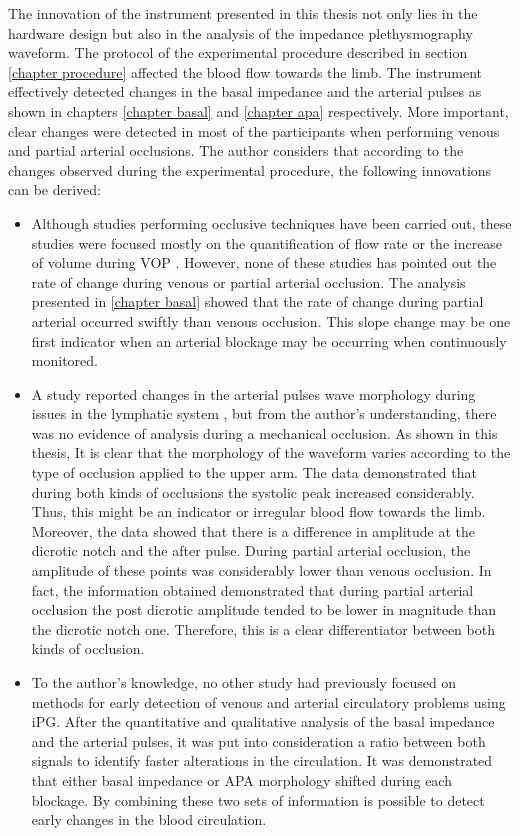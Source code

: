The innovation of the instrument presented in this thesis not only lies in the hardware design but also in the analysis of the impedance plethysmography waveform. The protocol of the experimental procedure described in section \ref{chapter procedure} affected the blood flow towards the limb. The instrument effectively detected changes in the basal impedance and the arterial pulses as shown in chapters \ref{chapter basal} and \ref{chapter apa} respectively. More important, clear changes were detected in most of the participants when performing venous and partial arterial occlusions. The author considers that according to the changes observed during the experimental procedure, the following innovations can be derived:

\begin{itemize}
	\item Although studies performing occlusive techniques have been carried out, these studies were focused mostly on the quantification of flow rate or the increase of volume during VOP \cite{mohapatra1979measurement, costeloe1980continuous, yamakoshi1980limb}. However, none of these studies has pointed out the rate of change during venous or partial arterial occlusion. The analysis presented in \ref{chapter basal} showed that the rate of change during partial arterial occurred swiftly than venous occlusion. This slope change may be one first indicator when an arterial blockage may be occurring when continuously monitored. 
	\item A study reported changes in the arterial pulses wave morphology during issues in the lymphatic system \cite{montgomery2011segmental}, but from the author's understanding, there was no evidence of analysis during a mechanical occlusion. As shown in this thesis, It is clear that the morphology of the waveform varies according to the type of occlusion applied to the upper arm. The data demonstrated that during both kinds of occlusions the systolic peak increased considerably. Thus, this might be an indicator or irregular blood flow towards the limb. Moreover, the data showed that there is a difference in amplitude at the dicrotic notch and the after pulse. During partial arterial occlusion, the amplitude of these points was considerably lower than venous occlusion. In fact, the information obtained demonstrated that during partial arterial occlusion the post dicrotic amplitude tended to be lower in magnitude than the dicrotic notch one. Therefore, this is a clear differentiator between both kinds of occlusion.
	\item To the author's knowledge, no other study had previously focused on methods for early detection of venous and arterial circulatory problems using iPG. After the quantitative and qualitative analysis of the basal impedance and the arterial pulses, it was put into consideration a ratio between both signals to identify faster alterations in the circulation. It was demonstrated that either basal impedance or APA morphology shifted during each blockage. By combining these two sets of information is possible to detect early changes in the blood circulation.
\end{itemize} 

